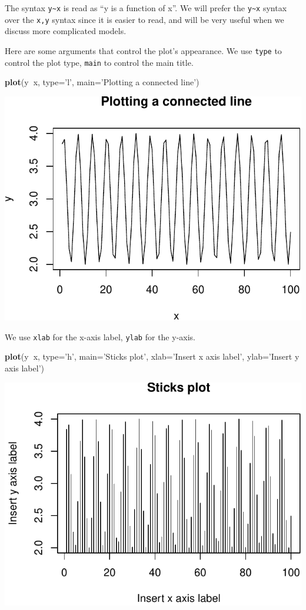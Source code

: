 \documentclass[]{book}
\newenvironment{Shaded}{\begin{snugshade}}{\end{snugshade}}
\newcommand{\KeywordTok}[1]{\textcolor[rgb]{0.13,0.29,0.53}{\textbf{#1}}}
\newcommand{\DataTypeTok}[1]{\textcolor[rgb]{0.13,0.29,0.53}{#1}}
\newcommand{\StringTok}[1]{\textcolor[rgb]{0.31,0.60,0.02}{#1}}
\newcommand{\OperatorTok}[1]{\textcolor[rgb]{0.81,0.36,0.00}{\textbf{#1}}}
\newcommand{\NormalTok}[1]{#1}
\theoremstyle{definition}
\theoremstyle{definition}
\theoremstyle{definition}
\theoremstyle{remark}
\begin{document}
The syntax \texttt{y\textasciitilde{}x} is read as ``y is a function of
x''. We will prefer the \texttt{y\textasciitilde{}x} syntax over the
\texttt{x,y} syntax since it is easier to read, and will be very useful
when we discuss more complicated models.

Here are some arguments that control the plot's appearance. We use
\texttt{type} to control the plot type, \texttt{main} to control the
main title.

\begin{Shaded}
\begin{Highlighting}[]
\KeywordTok{plot}\NormalTok{(y}\OperatorTok{~}\NormalTok{x, }\DataTypeTok{type=}\StringTok{'l'}\NormalTok{, }\DataTypeTok{main=}\StringTok{'Plotting a connected line'}\NormalTok{) }
\end{Highlighting}
\end{Shaded}

\includegraphics[width=0.5\linewidth]{Rcourse_files/figure-latex/unnamed-chunk-34-1}

We use \texttt{xlab} for the x-axis label, \texttt{ylab} for the y-axis.

\begin{Shaded}
\begin{Highlighting}[]
\KeywordTok{plot}\NormalTok{(y}\OperatorTok{~}\NormalTok{x, }\DataTypeTok{type=}\StringTok{'h'}\NormalTok{, }\DataTypeTok{main=}\StringTok{'Sticks plot'}\NormalTok{, }\DataTypeTok{xlab=}\StringTok{'Insert x axis label'}\NormalTok{, }\DataTypeTok{ylab=}\StringTok{'Insert y axis label'}\NormalTok{) }
\end{Highlighting}
\end{Shaded}

\includegraphics[width=0.5\linewidth]{Rcourse_files/figure-latex/unnamed-chunk-35-1}
\end{document}
